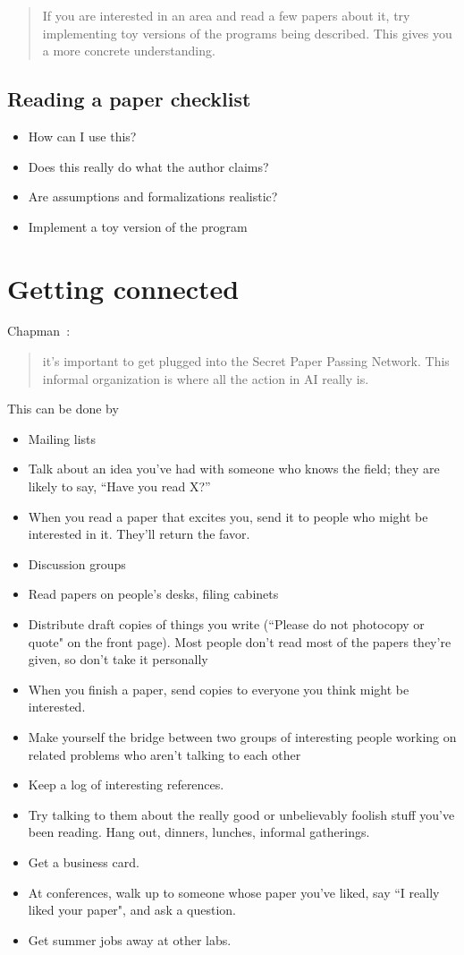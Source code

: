 \blockquote{If you are interested in an area and read a few papers about it, try
implementing toy versions of the programs being described. This gives you a more
concrete understanding.}

\subsection{Reading a paper checklist}

\begin{itemize}
\item How can I use this?
\item Does this really do what the author claims?
\item Are assumptions and formalizations realistic?
\item Implement a toy version of the program
\end{itemize}

\section{Getting connected}

Chapman~\cite{chapman1988how}:
\blockquote{it’s important to get plugged into the Secret Paper Passing Network.
This informal organization is where all the action in AI really is.}

This can be done by
\begin{itemize}
\item Mailing lists
\item Talk about an idea you’ve had with someone who knows the
field; they are likely to say, “Have you read X?” 
\item When you read a paper that excites you, send it to people who might be
interested in it. They'll return the favor.
\item Discussion groups
\item Read papers on people's desks, filing cabinets
\item Distribute draft copies of things you write (``Please do not photocopy or
quote" on the front page). Most people don’t read most of the papers they’re
given, so don’t take it personally
\item When you finish a paper, send copies to everyone you think might be
interested.
\item Make yourself the bridge between two groups of
interesting people working on related problems who aren’t talking to each
other
\item Keep a log of interesting references.
\item Try talking to them about the really good or unbelievably foolish stuff
you’ve been reading. Hang out, dinners, lunches, informal gatherings.
\item Get a business card.
\item At conferences, walk up to someone whose paper you’ve liked, say ``I really
liked your paper", and ask a question.
\item Get summer jobs away at other labs.
\end{itemize}

